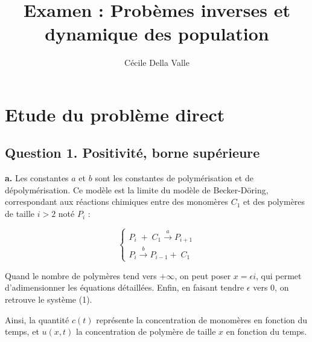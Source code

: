 \documentclass[a4paper]{article}
\title{Examen : Probèmes inverses et dynamique des population}
\author{Cécile Della Valle}
\begin{document}
\maketitle

\section{Etude du problème direct}

\subsection*{Question 1. Positivité, borne supérieure}


 \textbf{a.} Les constantes $a$ et $b$ sont les constantes de polymérisation et de dépolymérisation. 
 Ce modèle est la limite du modèle de Becker-Döring, 
 correspondant aux réactions chimiques entre des monomères $C_1$ 
 et des polymères de taille $i>2$ noté $P_i$ :
 
\begin{equation}
    \begin{cases}
	P_{i} \; + \; C_1 \overset{a}{\longrightarrow} P_{i+1}\\
	P_{i} \overset{b}{\longrightarrow}  P_{i-1} + \;C_1
    \end{cases}
\end{equation}

Quand le nombre de polymères tend vers $+\infty$, 
on peut poser $x=\epsilon i$, 
qui permet d'adimensionner les équations détaillées. 
Enfin, en faisant tendre $\epsilon$ vers $0$,
on retrouve le système (1).

Ainsi, la quantité $c(t)$ représente 
la concentration de monomères en fonction du temps, et $u(x,t)$ la concentration de polymère de taille $x$ en fonction du temps.
\end{document}

